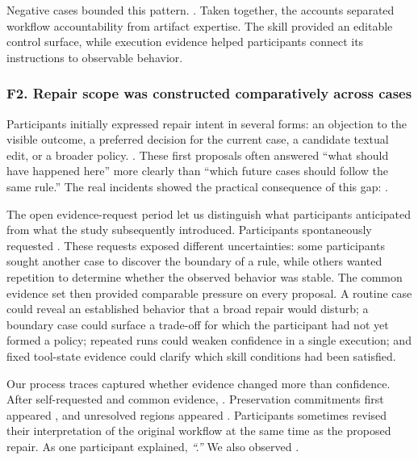 Negative cases bounded this pattern. . Taken
together, the accounts separated workflow accountability from artifact
expertise. The skill provided an editable control surface, while execution
evidence helped participants connect its instructions to observable behavior.

\subsubsection{F2. Repair scope was constructed comparatively across cases}
\label{sec:f2-scope}

Participants initially expressed repair intent in several forms: an objection
to the visible outcome, a preferred decision for the current case, a candidate
textual edit, or a broader policy. . These first proposals often
answered ``what should have happened here'' more clearly than ``which future
cases should follow the same rule.'' The real incidents showed the practical
consequence of this gap: .

The open evidence-request period let us distinguish what participants
anticipated from what the study subsequently introduced. Participants
spontaneously requested . These requests exposed different uncertainties: some participants
sought another case to discover the boundary of a rule, while others wanted
repetition to determine whether the observed behavior was stable. The common
evidence set then provided comparable pressure on every proposal. A routine
case could reveal an established behavior that a broad repair would disturb; a
boundary case could surface a trade-off for which the participant had not yet
formed a policy; repeated runs could weaken confidence in a single execution;
and fixed tool-state evidence could clarify which skill conditions had been
satisfied.

Our process traces captured whether evidence changed more than confidence.
After self-requested and common evidence, .
Preservation commitments first appeared ,
and unresolved regions appeared .
Participants sometimes revised their interpretation of the original workflow
at the same time as the proposed repair. As one participant explained,
\emph{``.''} We also observed
.

